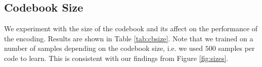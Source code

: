 \documentclass{article}
\begin{document}

\subsection{Codebook Size}
We experiment with the size of the codebook and its affect on the
performance of the encoding. Results are shown in Table \ref{tab:cbsize}.
Note that we trained on a number of samples depending on the codebook
size, i.e. we used $500$ samples per code to learn. This is consistent
with our findings from Figure \ref{fig:sizes}.
\end{document}
